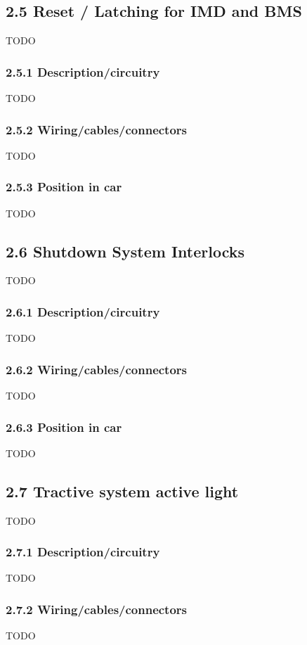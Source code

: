 \documentclass{article}
\begin{document}
\subsection*{2.5 Reset / Latching for IMD and BMS}
TODO

\subsubsection*{2.5.1 Description/circuitry}
TODO

\subsubsection*{2.5.2 Wiring/cables/connectors}
TODO

\subsubsection*{2.5.3 Position in car}
TODO

\subsection*{2.6 Shutdown System Interlocks}
TODO

\subsubsection*{2.6.1 Description/circuitry}
TODO

\subsubsection*{2.6.2 Wiring/cables/connectors}
TODO

\subsubsection*{2.6.3 Position in car}
TODO

\subsection*{2.7 Tractive system active light}
TODO

\subsubsection*{2.7.1 Description/circuitry}
TODO

\subsubsection*{2.7.2 Wiring/cables/connectors}
TODO
\end{document}
